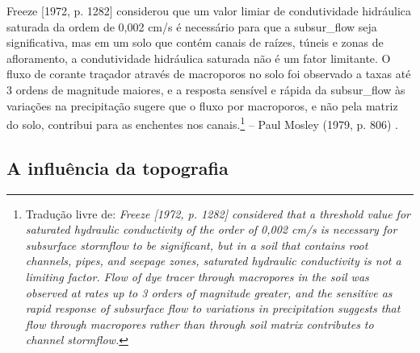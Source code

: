 \documentclass[./main.tex]{subfiles}
\begin{document}
\begin{adjustwidth}{100pt}{0pt}
\medskip
\small Freeze [1972, p. 1282] considerou que um valor limiar de condutividade hidráulica saturada da ordem de 0,002 cm/s é necessário para que a \gls{subsur_flow} seja significativa, mas em um solo que contém canais de raízes, túneis e zonas de afloramento, a condutividade hidráulica saturada não é um fator limitante. O fluxo de corante traçador através de macroporos no solo foi observado a taxas até 3 ordens de magnitude maiores, e a resposta sensível e rápida da \gls{subsur_flow} às variações na precipitação sugere que o fluxo por macroporos, e não pela matriz do solo, contribui para as enchentes nos canais.\footnote{Tradução livre de: \textit{Freeze [1972, p. 1282] considered that a threshold value for saturated hydraulic conductivity of the order of 0,002 cm/s is necessary for subsurface stormflow to be significant, but in a soil that contains root channels, pipes, and seepage zones, saturated hydraulic conductivity is not a limiting factor. Flow of dye tracer through macropores in the soil was observed at rates up to 3 orders of magnitude greater, and the sensitive as rapid response of subsurface flow to variations in precipitation suggests that flow through macropores rather than through soil matrix contributes to channel stormflow.}} -- Paul Mosley (1979, p. 806) \cite{Mosley1979}.
\medskip
\end{adjustwidth}

\subsection{A influência da topografia}
\end{document}
